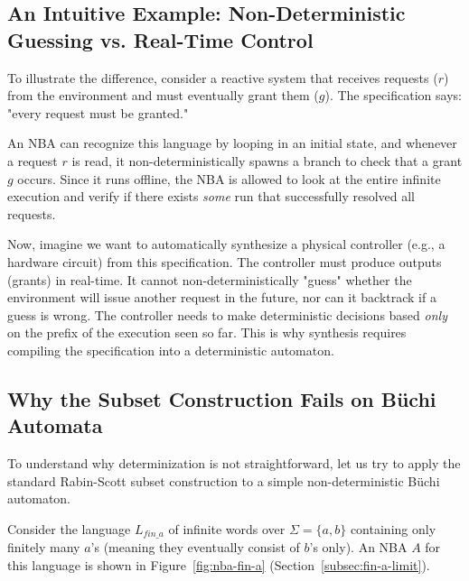 \subsection{An Intuitive Example: Non-Deterministic Guessing vs. Real-Time Control}
To illustrate the difference, consider a reactive system that receives requests ($r$) from the environment and must eventually grant them ($g$). The specification says: "every request must be granted."

An NBA can recognize this language by looping in an initial state, and whenever a request $r$ is read, it non-deterministically spawns a branch to check that a grant $g$ occurs. Since it runs offline, the NBA is allowed to look at the entire infinite execution and verify if there exists \emph{some} run that successfully resolved all requests.

Now, imagine we want to automatically synthesize a physical controller (e.g., a hardware circuit) from this specification. The controller must produce outputs (grants) in real-time. It cannot non-deterministically "guess" whether the environment will issue another request in the future, nor can it backtrack if a guess is wrong. The controller needs to make deterministic decisions based \emph{only} on the prefix of the execution seen so far. This is why synthesis requires compiling the specification into a deterministic automaton.


\subsection{Why the Subset Construction Fails on Büchi Automata}
To understand why determinization is not straightforward, let us try to apply the standard Rabin-Scott subset construction to a simple non-deterministic Büchi automaton.

Consider the language $L_{fin\_a}$ of infinite words over $\Sigma = \{a,b\}$ containing only finitely many $a$'s (meaning they eventually consist of $b$'s only). An NBA $A$ for this language is shown in Figure~\ref{fig:nba-fin-a} (Section~\ref{subsec:fin-a-limit}).

